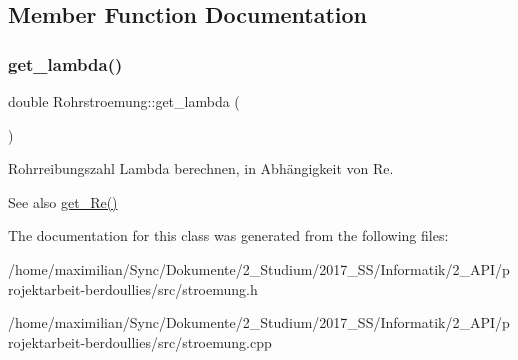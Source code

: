 \subsection{Member Function Documentation}
\mbox{\label{class_rohrstroemung_a7ea25aca94625ef68bf856d957419d26}} 
\subsubsection{\texorpdfstring{get\+\_\+lambda()}{get\_lambda()}}
{\footnotesize\ttfamily double Rohrstroemung\+::get\+\_\+lambda (\begin{DoxyParamCaption}{ }\end{DoxyParamCaption})}



Rohrreibungszahl Lambda berechnen, in Abhängigkeit von Re. 

\begin{DoxySeeAlso}{See also}
\hyperlink{class_rohrstroemung_aa491056aa77acac305aca0fde9c3e8bc}{get\+\_\+\+Re()} 
\end{DoxySeeAlso}


The documentation for this class was generated from the following files\+:\begin{DoxyCompactItemize}
\item 
/home/maximilian/\+Sync/\+Dokumente/2\+\_\+\+Studium/2017\+\_\+\+S\+S/\+Informatik/2\+\_\+\+A\+P\+I/projektarbeit-\/berdoullies/src/stroemung.\+h\item 
/home/maximilian/\+Sync/\+Dokumente/2\+\_\+\+Studium/2017\+\_\+\+S\+S/\+Informatik/2\+\_\+\+A\+P\+I/projektarbeit-\/berdoullies/src/stroemung.\+cpp\end{DoxyCompactItemize}
